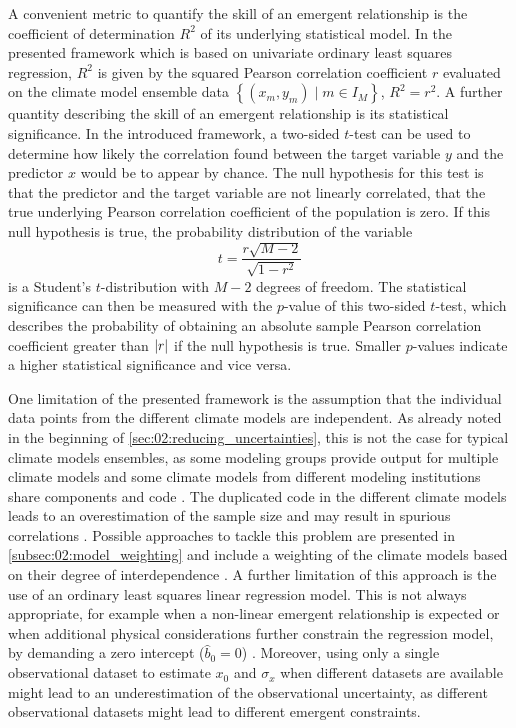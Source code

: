 A convenient metric to quantify the skill of an emergent relationship is the
coefficient of determination $R^2$ of its underlying statistical model. In the
presented framework which is based on univariate ordinary least squares
regression, $R^2$ is given by the squared Pearson correlation coefficient $r$
evaluated on the climate model ensemble data $\left\{ \left( x_m, y_m \right)
\mid m \in I_M \right\}$, \ie{} $R^2 = r^2$. A further quantity describing the
skill of an emergent relationship is its statistical significance. In the
introduced framework, a two-sided $t$-test can be used to determine how likely
the correlation found between the target variable $y$ and the predictor $x$
would be to appear by chance. The null hypothesis for this test is that the
predictor and the target variable are not linearly correlated, \ie{} that the
true underlying Pearson correlation coefficient of the population is zero. If
this null hypothesis is true, the probability distribution of the variable
\begin{equation}
  t = \frac{r \sqrt{M - 2}}{\sqrt{1 - r^2}}
  \label{eq:02:t}
\end{equation}
is a Student's $t$-distribution with $M - 2$ degrees of freedom. The
statistical significance can then be measured with the $p$-value of this
two-sided $t$-test, which describes the probability of obtaining an absolute
sample Pearson correlation coefficient greater than $\abs*{r}$ if the null
hypothesis is true. Smaller $p$-values indicate a higher statistical
significance and vice versa.

One limitation of the presented framework is the assumption that the individual
data points from the different climate models are independent. As already noted
in the beginning of \cref{sec:02:reducing_uncertainties}, this is not the case
for typical climate models ensembles, as some modeling groups provide output
for multiple climate models and some climate models from different modeling
institutions share components and code \autocite{Knutti2013}. The duplicated
code in the different climate models leads to an overestimation of the sample
size and may result in spurious correlations \autocite{Sanderson2015}. Possible
approaches to tackle this problem are presented in
\cref{subsec:02:model_weighting} and include a weighting of the climate models
based on their degree of interdependence \autocite{Knutti2017a, Sanderson2015,
  Sanderson2017}. A further limitation of this approach is the use of an
ordinary least squares linear regression model. This is not always appropriate,
for example when a non-linear emergent relationship is expected
\autocite{Nijsse2020} or when additional physical considerations further
constrain the regression model, \eg{} by demanding a zero intercept ($\hat{b}_0
= 0$) \autocite{Annan2020, JimenezdelaCuesta2019}. Moreover, using only a
single observational dataset to estimate $x_0$ and $\sigma_x$ when different
datasets are available might lead to an underestimation of the observational
uncertainty, as different observational datasets might lead to different
emergent constraints.

